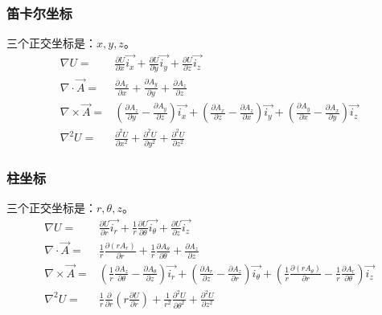 \subsubsection{笛卡尔坐标}
三个正交坐标是：$x, y, z$。
\begin{subequations}\label{eqn:field cart}
	\begin{align}
\nabla U=&\frac{\partial U}{\partial x}\vec{i_x} +\frac{\partial U}{\partial y}\vec{i_y}+\frac{\partial U}{\partial z}\vec{i_z}  \\
\nabla\cdot \vec{A}=& \frac{\partial{A_x}}{\partial x} +\frac{\partial{A_y}}{\partial y}+\frac{\partial{A_z}}{\partial z}\\
\nabla\times \vec{A}=& \left(\frac{\partial{A_z}}{\partial y} -\frac{\partial{A_y}}{\partial z}\right)\vec{i_x} + \left(\frac{\partial{A_x}}{\partial z} -\frac{\partial{A_z}}{\partial x}\right) \vec{i_y}
+ \left(\frac{\partial{A_y}}{\partial x} -\frac{\partial{A_x}}{\partial y}\right)\vec{i_z} \\
\nabla^2 U=&\frac{\partial^2 U}{\partial x^2}+\frac{\partial^2 U}{\partial y^2}+\frac{\partial^2 U}{\partial z^2}
  	\end{align}
\end{subequations}

\subsubsection{柱坐标}
三个正交坐标是：$r, \theta, z$。
\begin{subequations}\label{eqn:field cyl}
	\begin{align}
\nabla U=&\frac{\partial U}{\partial r}\vec{i_r} +\frac{1}{r}\frac{\partial U}{\partial \theta}\vec{i_{\theta}}+\frac{\partial U}{\partial z}\vec{i_z} \\
\nabla\cdot \vec{A} =& \frac{1}{r}\frac{\partial{(r A_r)}}{\partial r} +\frac{1}{r}\frac{\partial{A_\theta}}{\partial \theta}+\frac{\partial{A_z}}{\partial z} \\
\nabla\times \vec{A}=& \left(\frac{1}{r}\frac{\partial{A_z}}{\partial \theta} -\frac{\partial{A_\theta}}{\partial z}\right)\vec{i_r} + \left(\frac{\partial{A_r}}{\partial z} -\frac{\partial{A_z}}{\partial r}\right) \vec{i_\theta}+ \left(\frac{1}{r}\frac{\partial{(r A_\theta)}}{\partial r} -\frac{1}{r}\frac{\partial{A_r}}{\partial \theta}\right)\vec{i_z}\\
\nabla^2 U=&\frac{1}{r}\frac{\partial}{\partial r}\left(r\frac{\partial U}{\partial r}\right)+\frac{1}{r^2}\frac{\partial^2 U}{\partial \theta^2}+\frac{\partial^2 U}{\partial z^2}
  	\end{align}
\end{subequations}

